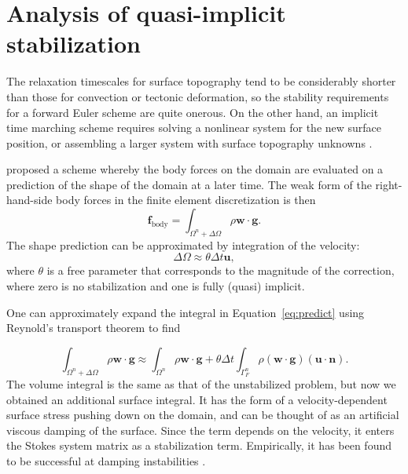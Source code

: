 \documentclass[preprint,12pt,authoryear]{elsarticle}
\begin{document}
\section{Analysis of quasi-implicit stabilization}
\label{sec:kmm}

The relaxation timescales for surface topography tend to be considerably shorter than those for 
convection or tectonic deformation, so the stability requirements for a forward Euler scheme
are quite onerous.  On the other hand, an implicit time marching scheme requires solving 
a nonlinear system for the new surface position, or assembling a larger system with surface
topography unknowns \citep[e.g.][]{kramer2012implicit}.

\citet{kaus2010stabilization} proposed a scheme whereby the body forces on the domain are 
evaluated on a prediction of the shape of the domain at a later time.
The weak form of the right-hand-side body forces in the finite element discretization is then
\begin{equation}
\mathbf{f}_{\mathrm{body}} = \int_{\Omega^n + \Delta \Omega} \rho \mathbf{w} \cdot \mathbf{g}.
\label{eq:predict}
\end{equation}
The shape prediction can be approximated by integration of the velocity:
\begin{equation}
\Delta \Omega \approx \theta \Delta t \mathbf{u},
\end{equation}
where $\theta$ is a free parameter that corresponds to the magnitude of the 
correction, where zero is no stabilization and one is fully (quasi) implicit.

One can approximately expand the integral in Equation~\eqref{eq:predict} using 
Reynold's transport theorem to find

\begin{equation}
\int_{\Omega^n + \Delta \Omega} \rho  \mathbf{w} \cdot \mathbf{g} \approx
\int_{\Omega^n} \rho  \mathbf{w} \cdot \mathbf{g} + \theta \Delta t \int_{\Gamma_F^n} \rho ( \mathbf{w \cdot g}) (\mathbf{u \cdot n} ).
\label{eq:kmm}
\end{equation}
The volume integral is the same as that of the unstabilized problem, but now we obtained an additional surface integral.
It has the form of a velocity-dependent surface stress pushing down on the 
domain, and can be thought of as an artificial viscous damping of the surface.
Since the term depends on the velocity, it 
enters the Stokes system matrix as a stabilization term.  
Empirically, it has been found to be successful at damping instabilities \citep{kaus2010stabilization, quinquis2011role, duretz2011discretization}.
\end{document}
